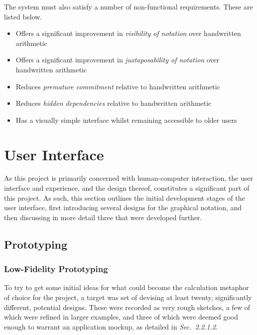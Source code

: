 \documentclass[12pt,twoside,notitlepage,xetex]{report}
\begin{document}
The system must also satisfy a number of non-functional requirements.  These are listed below.
\begin{itemize}
\item Offers a significant improvement in \emph{visibility of notation} over handwritten arithmetic
\item Offers a significant improvement in \emph{juxtaposability of notation} over handwritten arithmetic
\item Reduces \emph{premature commitment} relative to handwritten arithmetic
\item Reduces \emph{hidden dependencies} relative to handwritten arithmetic
\item Has a visually simple interface whilst remaining accessible to older users
\end{itemize}

\section{User Interface}

As this project is primarily concerned with human-computer interaction, the
user interface and experience, and the design thereof, constitutes a
significant part of this project.  As such, this section outlines the initial
development stages of the user interface, first introducing several designs for
the graphical notation, and then discussing in more detail three that were
developed further.

\subsection{Prototyping}

\subsubsection{Low-Fidelity Prototyping}

To try to get some initial ideas for what could become the calculation metaphor
of choice for the project, a target was set of devising at least twenty,
significantly different, potential designs.  These were recorded as very rough
sketches, a few of which were refined in larger examples, and three of which
were deemed good enough to warrant an application mockup, as detailed in
\emph{Sec.~2.2.1.2}.
\end{document}
